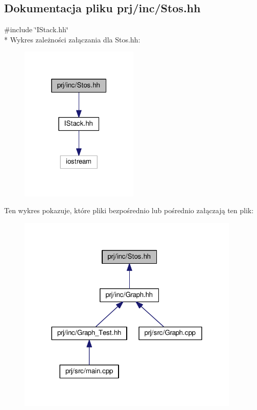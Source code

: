 \hypertarget{_stos_8hh}{\subsection{Dokumentacja pliku prj/inc/\-Stos.hh}
\label{_stos_8hh}
}
{\ttfamily \#include \char`\"{}I\-Stack.\-hh\char`\"{}}\\*
Wykres zależności załączania dla Stos.\-hh\-:
\nopagebreak
\begin{figure}[H]
\begin{center}
\leavevmode
\includegraphics[width=160pt]{_stos_8hh__incl}
\end{center}
\end{figure}
Ten wykres pokazuje, które pliki bezpośrednio lub pośrednio załączają ten plik\-:
\nopagebreak
\begin{figure}[H]
\begin{center}
\leavevmode
\includegraphics[width=300pt]{_stos_8hh__dep__incl}
\end{center}
\end{figure}
